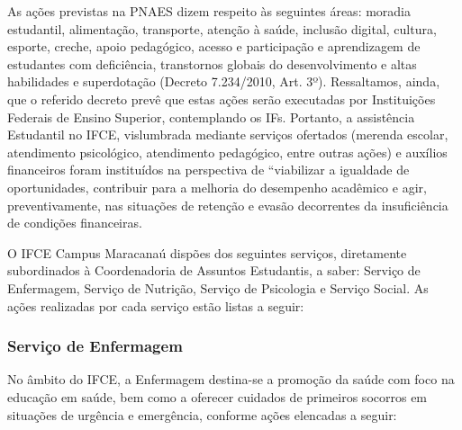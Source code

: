 As ações previstas na PNAES dizem respeito às seguintes áreas: moradia estudantil, alimentação, transporte, atenção à saúde, inclusão digital, cultura, esporte, creche, apoio pedagógico, acesso e participação e aprendizagem de estudantes com deficiência, transtornos globais do desenvolvimento e altas habilidades e superdotação (Decreto 7.234/2010, Art. 3º). Ressaltamos, ainda, que o referido decreto prevê que estas ações serão executadas por Instituições Federais de Ensino Superior, contemplando os IFs. 
Portanto, a assistência Estudantil no IFCE, vislumbrada mediante serviços ofertados (merenda escolar, atendimento psicológico, atendimento pedagógico, entre outras ações) e auxílios financeiros foram instituídos na perspectiva de “viabilizar a igualdade de oportunidades, contribuir para a melhoria do desempenho acadêmico e agir, preventivamente, nas situações de retenção e evasão decorrentes da insuficiência de condições financeiras.

O IFCE Campus Maracanaú dispões dos seguintes serviços, diretamente subordinados à Coordenadoria de Assuntos Estudantis, a saber: Serviço de Enfermagem, Serviço de Nutrição, Serviço de Psicologia e Serviço Social. As ações realizadas por cada serviço estão listas a seguir:

\subsubsection{Serviço de Enfermagem} 

No âmbito do IFCE, a Enfermagem destina-se a promoção da saúde com foco na educação em saúde, bem como a oferecer cuidados de primeiros socorros em situações de urgência e emergência, conforme ações elencadas a seguir: 

